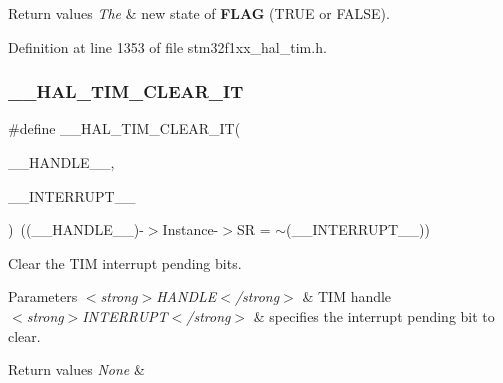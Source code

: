 \begin{DoxyRetVals}{Return values}
{\em The} & new state of {\bfseries F\+L\+AG} (T\+R\+UE or F\+A\+L\+SE). \\
\hline
\end{DoxyRetVals}


Definition at line 1353 of file stm32f1xx\+\_\+hal\+\_\+tim.\+h.

\mbox{\label{group___t_i_m___exported___macros_gaea68155ce77e591e0c2582def061d6f0}} 
\subsubsection{\texorpdfstring{\+\_\+\+\_\+\+H\+A\+L\+\_\+\+T\+I\+M\+\_\+\+C\+L\+E\+A\+R\+\_\+\+IT}{\_\_HAL\_TIM\_CLEAR\_IT}}
{\footnotesize\ttfamily \#define \+\_\+\+\_\+\+H\+A\+L\+\_\+\+T\+I\+M\+\_\+\+C\+L\+E\+A\+R\+\_\+\+IT(\begin{DoxyParamCaption}\item[{}]{\+\_\+\+\_\+\+H\+A\+N\+D\+L\+E\+\_\+\+\_\+,  }\item[{}]{\+\_\+\+\_\+\+I\+N\+T\+E\+R\+R\+U\+P\+T\+\_\+\+\_\+ }\end{DoxyParamCaption})~((\+\_\+\+\_\+\+H\+A\+N\+D\+L\+E\+\_\+\+\_\+)-\/$>$Instance-\/$>$SR = $\sim$(\+\_\+\+\_\+\+I\+N\+T\+E\+R\+R\+U\+P\+T\+\_\+\+\_\+))}



Clear the T\+IM interrupt pending bits. 


\begin{DoxyParams}{Parameters}
{\em $<$strong$>$\+H\+A\+N\+D\+L\+E$<$/strong$>$} & T\+IM handle \\
\hline
{\em $<$strong$>$\+I\+N\+T\+E\+R\+R\+U\+P\+T$<$/strong$>$} & specifies the interrupt pending bit to clear. \\
\hline
\end{DoxyParams}

\begin{DoxyRetVals}{Return values}
{\em None} & \\
\hline
\end{DoxyRetVals}


